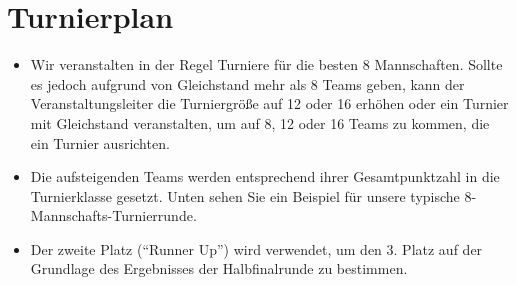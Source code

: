 \documentclass[a4paper,12pt]{article}
\begin{document}
\section{Turnierplan}
\begin{itemize}
	\item Wir veranstalten in der Regel Turniere für die besten 8 Mannschaften. Sollte es jedoch aufgrund von Gleichstand mehr als 8 Teams geben, kann der Veranstaltungsleiter die Turniergröße auf 12 oder 16 erhöhen oder ein Turnier mit Gleichstand veranstalten, um auf 8, 12 oder 16 Teams zu kommen, die ein Turnier ausrichten.
	\item Die aufsteigenden Teams werden entsprechend ihrer Gesamtpunktzahl in die Turnierklasse gesetzt. Unten sehen Sie ein Beispiel für unsere typische 8-Mannschafts-Turnierrunde.
	\item Der zweite Platz ("`Runner Up"') wird verwendet, um den 3. Platz auf der Grundlage des Ergebnisses der Halbfinalrunde zu bestimmen.
\end{itemize}
\begin{figure}[H]
	\centering
	\def\svgwidth{\columnwidth}
	
\end{figure}
\end{document}
